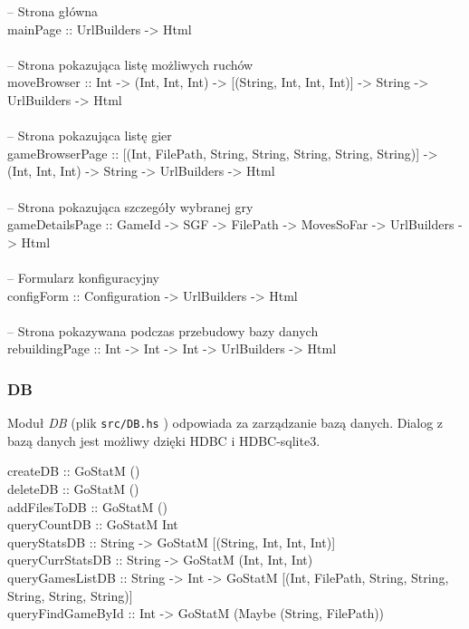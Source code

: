 \documentclass[10pt,leqno]{article}
\newcommand{\cmd}[1]{
  \texttt{#1}
}
\begin{document}
\begin{framed}
\noindent -- Strona główna \\
mainPage :: UrlBuilders -> Html \\ \\
-- Strona pokazująca listę możliwych ruchów \\ 
moveBrowser :: Int -> (Int, Int, Int) -> [(String, Int, Int, Int)] -> String -> UrlBuilders -> Html \\ \\
-- Strona pokazująca listę gier \\
gameBrowserPage :: [(Int, FilePath, String, String, String, String, String)] -> (Int, Int, Int) -> String -> UrlBuilders -> Html \\ \\
-- Strona pokazująca szczegóły wybranej gry \\
gameDetailsPage :: GameId -> SGF -> FilePath -> MovesSoFar -> UrlBuilders -> Html \\ \\
-- Formularz konfiguracyjny \\
configForm :: Configuration -> UrlBuilders -> Html \\ \\
-- Strona pokazywana podczas przebudowy bazy danych \\
rebuildingPage :: Int -> Int -> Int -> UrlBuilders -> Html
\end{framed}


\subsubsection{DB}
Moduł \emph{DB} (plik \cmd{src/DB.hs}) odpowiada za zarządzanie bazą danych. Dialog
z bazą danych jest możliwy dzięki HDBC i HDBC-sqlite3.

\begin{framed}
\noindent createDB :: GoStatM () \\
deleteDB :: GoStatM () \\
addFilesToDB :: GoStatM () \\
queryCountDB :: GoStatM Int \\
queryStatsDB :: String -> GoStatM [(String, Int, Int, Int)] \\
queryCurrStatsDB :: String -> GoStatM (Int, Int, Int) \\
queryGamesListDB :: String -> Int -> GoStatM [(Int, FilePath, String, String, String, String, String)] \\
queryFindGameById :: Int -> GoStatM (Maybe (String, FilePath))
\end{framed}          
\end{document}
